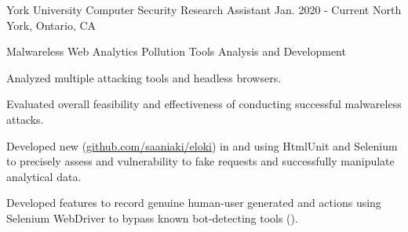 

\begin{cventries}

  \cventry
    {York University} %
    {Computer Security Research Assistant} %
    {Jan. 2020 - Current} %
    {North York, Ontario, CA} %
    {
      \begin{cvitems} %
        \item {Malwareless Web Analytics Pollution Tools Analysis and Development}
          \begin{cvsubitems}
            \item {Analyzed multiple attacking tools and headless browsers.}
            \item {Evaluated overall feasibility and effectiveness of conducting successful malwareless attacks.}
            \item {Developed new  (\underline{\href{https://github.com/saaniaki/eloki}{github.com/saaniaki/eloki}}) in  and  using HtmlUnit and Selenium to precisely assess  and  vulnerability to fake requests and successfully manipulate analytical data.}
            \item {Developed features to record genuine human-user generated  and actions using Selenium WebDriver to bypass known bot-detecting tools ().}
          \end{cvsubitems}
      \end{cvitems}
    }


\end{cventries}
